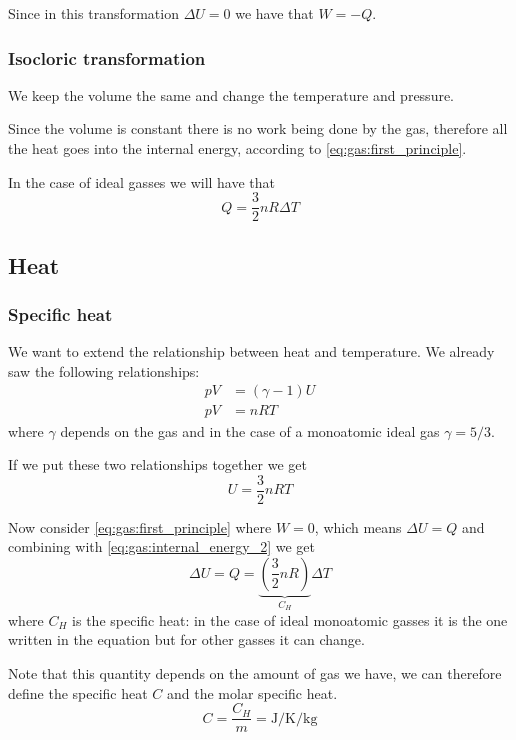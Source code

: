 \documentclass[12pt]{extarticle}
\begin{document}
Since in this transformation $\Delta U = 0$ we have that $W = -Q$.

\subsubsection{Isocloric transformation}

We keep the volume the same and change the temperature and pressure.

Since the volume is constant there is no work being done by the gas, therefore all the heat goes into the internal energy, according to \autoref{eq:gas:first_principle}.

In the case of ideal gasses we will have that
\begin{equation}
    Q = \frac{3}{2}nR\Delta T
\end{equation}

\subsection{Heat}

\subsubsection{Specific heat}

We want to extend the relationship between heat and temperature.
We already saw the following relationships:
\begin{align}
    pV & = (\gamma - 1)U \\
    pV & = nRT
\end{align}
where $\gamma$ depends on the gas and in the case of a monoatomic ideal gas $\gamma = 5/3$.

If we put these two relationships together we get
\begin{equation}
    \label{eq:gas:internal_energy_2}
    U = \frac{3}{2}nRT
\end{equation}

Now consider \autoref{eq:gas:first_principle} where $W = 0$, which means $\Delta U = Q$ and combining with \autoref{eq:gas:internal_energy_2} we get
\begin{equation}
    \Delta U = Q = \underbrace{\left(\frac{3}{2} n R \right)}_{C_H} \Delta T
\end{equation}
where $C_H$ is the specific heat: in the case of ideal monoatomic gasses it is the one written in the equation but for other gasses it can change.

Note that this quantity depends on the amount of gas we have, we can therefore define the specific heat $C$ and the molar specific heat.
\begin{equation}
    C = \frac{C_H}{m} = \si{\joule \per \kelvin \per \kilogram}
\end{equation}
\end{document}
